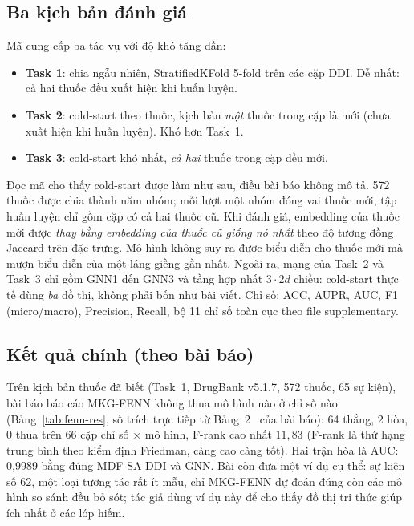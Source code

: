 \documentclass[conference]{IEEEtran}
\renewcommand{\hl}[1]{#1}
\begin{document}
\subsection{Ba kịch bản đánh giá}
Mã cung cấp ba tác vụ với độ khó tăng dần:
\begin{itemize}
  \item \textbf{Task 1}: chia ngẫu nhiên, StratifiedKFold 5-fold trên các cặp
  DDI. Dễ nhất: cả hai thuốc đều xuất hiện khi huấn luyện.
  \item \textbf{Task 2}: cold-start theo thuốc, kịch bản \emph{một} thuốc trong cặp là mới
  (chưa xuất hiện khi huấn luyện). Khó hơn Task~1.
  \item \textbf{Task 3}: cold-start khó nhất, \emph{cả hai} thuốc trong cặp đều mới.
\end{itemize}
Đọc mã cho thấy cold-start được làm như sau, điều bài báo không mô tả. 572 thuốc được chia
thành năm nhóm; mỗi lượt một nhóm đóng vai thuốc mới, tập huấn luyện chỉ gồm cặp có cả hai thuốc
cũ. Khi đánh giá, embedding của thuốc mới được \emph{thay bằng embedding của thuốc cũ giống nó
nhất} theo độ tương đồng Jaccard trên đặc trưng. \hl{Mô hình} không suy ra được biểu
diễn cho thuốc mới mà mượn biểu diễn của một láng giềng gần nhất. Ngoài ra, mạng của Task~2 và
Task~3 chỉ gồm GNN1 đến GNN3 và tầng hợp nhất $3\cdot 2d$ chiều: cold-start thực tế dùng
\emph{ba} đồ thị, không phải bốn như bài viết.
Chỉ số: ACC, AUPR, AUC, F1 (micro/macro), Precision, Recall, bộ 11 chỉ số toàn
cục theo file supplementary.

\subsection{Kết quả chính (theo bài báo)}
\label{sec:fenn-paper}
Trên kịch bản thuốc đã biết (Task~1, DrugBank v5.1.7, 572 thuốc, 65 sự kiện), bài báo
báo cáo MKG-FENN không thua mô hình nào ở chỉ số nào (Bảng~\ref{tab:fenn-res}, số trích trực tiếp
từ Bảng~2~\cite{mkgfenn} của bài báo): 64 thắng, 2 hòa, 0 thua trên 66 cặp chỉ số $\times$ mô hình, F-rank cao nhất
$11{,}83$ (F-rank là thứ hạng trung bình theo kiểm định Friedman, càng cao càng tốt). Hai trận hòa là AUC: 0,9989 bằng đúng MDF-SA-DDI và GNN. Bài còn đưa một ví dụ cụ thể:
sự kiện số 62, một loại tương tác rất ít mẫu, chỉ MKG-FENN dự đoán đúng còn các mô hình so sánh đều
bỏ sót; tác giả dùng ví dụ này để cho thấy đồ thị tri thức giúp ích nhất ở các lớp hiếm.
\end{document}
